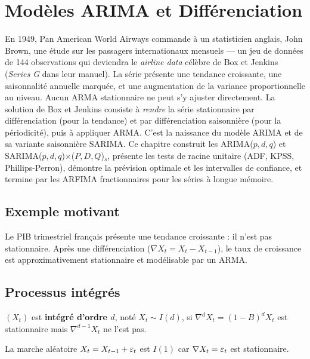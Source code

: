 \chapter{Mod\`eles ARIMA et Diff\'erenciation}
\label{ch:arima}

En 1949, Pan American World Airways commande à un statisticien anglais, John Brown, une étude sur les passagers internationaux mensuels --- un jeu de données de 144 observations qui deviendra le \emph{airline data} célèbre de Box et Jenkins (\emph{Series G} dans leur manuel). La série présente une tendance croissante, une saisonnalité annuelle marquée, et une augmentation de la variance proportionnelle au niveau. Aucun ARMA stationnaire ne peut s'y ajuster directement. La solution de Box et Jenkins consiste à \emph{rendre} la série stationnaire par différenciation (pour la tendance) et par différenciation saisonnière (pour la périodicité), puis à appliquer ARMA. C'est la naissance du modèle ARIMA et de sa variante saisonnière SARIMA. Ce chapitre construit les ARIMA($p,d,q$) et SARIMA($p,d,q$)$\times$($P,D,Q$)$_s$, présente les tests de racine unitaire (ADF, KPSS, Phillips-Perron), démontre la prévision optimale et les intervalles de confiance, et termine par les ARFIMA fractionnaires pour les séries à longue mémoire.

\section{Exemple motivant}
Le PIB trimestriel fran\c{c}ais pr\'esente une tendance croissante : il n'est pas stationnaire. Apr\`es une diff\'erenciation ($\nabla X_t = X_t - X_{t-1}$), le taux de croissance est approximativement stationnaire et mod\'elisable par un ARMA.

\section{Processus int\'egr\'es}

\begin{definition}
$(X_t)$ est \textbf{int\'egr\'e d'ordre $d$}, not\'e $X_t\sim I(d)$, si $\nabla^d X_t = (1-B)^d X_t$ est stationnaire mais $\nabla^{d-1}X_t$ ne l'est pas.
\end{definition}

\begin{exemple}
La marche al\'eatoire $X_t=X_{t-1}+\varepsilon_t$ est $I(1)$ car $\nabla X_t = \varepsilon_t$ est stationnaire.
\end{exemple}

